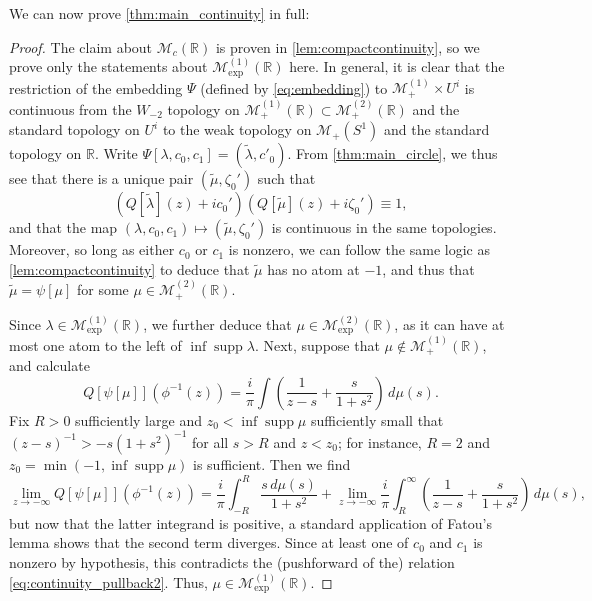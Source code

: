\documentclass{cams-l} %
\newcommand{\RR}{\mathbb R}
\newcommand{\cM}{\mathcal M}
\newcommand{\supp}{\operatorname{supp}}
\theoremstyle{definition}
\theoremstyle{remark}
\numberwithin{equation}{section}
\begin{document}
We can now prove \cref{thm:main_continuity} in full:
\thmmaincontinuity*
\begin{proof}
    The claim about $\cM_c(\RR)$ is proven in \cref{lem:compactcontinuity}, so we prove only the statements about $\cM_\text{exp}^{(1)}(\RR)$ here. In general, it is clear that the restriction of the embedding $\Psi$ (defined by \cref{eq:embedding}) to $\cM_+^{(1)}\times U^i$ is continuous from the $W_{-2}$ topology on $\cM_+^{(1)}(\RR)\subset\cM_+^{(2)}(\RR)$ and the standard topology on $U^i$ to the weak topology on $\cM_+(S^1)$ and the standard topology on $\RR$. Write $\Psi[\lambda,c_0,c_1] = (\widetilde{\lambda},c'_0)$. From \cref{thm:main_circle}, we thus see that there is a unique pair $(\widetilde{\mu},\zeta_0')$ such that
    \begin{equation}\label{eq:continuity_pullback2}
        (Q[\widetilde{\lambda}](z) + ic_0')(Q[\widetilde{\mu}](z) + i\zeta_0') \equiv 1,
    \end{equation}
    and that the map $(\lambda,c_0,c_1)\mapsto (\widetilde{\mu},\zeta_0')$ is continuous in the same topologies. Moreover, so long as either $c_0$ or $c_1$ is nonzero, we can follow the same logic as \cref{lem:compactcontinuity} to deduce that $\widetilde{\mu}$ has no atom at $-1$, and thus that $\widetilde{\mu}=\psi[\mu]$ for some $\mu\in\cM_+^{(2)}(\RR)$.
    
    Since $\lambda\in\cM_\mathrm{exp}^{(1)}(\RR)$, we further deduce that $\mu\in\cM_\mathrm{exp}^{(2)}(\RR)$, as it can have at most one atom to the left of $\inf\supp\lambda$. Next, suppose that $\mu\notin\cM_+^{(1)}(\RR)$, and calculate
    \[Q[\psi[\mu]](\phi^{-1}(z)) = \frac{i}{\pi}\int\left(\frac{1}{z-s} + \frac{s}{1+s^2}\right)\,d\mu(s).\]
    Fix $R>0$ sufficiently large and $z_0<\inf\supp\mu$ sufficiently small that $(z-s)^{-1}>-s(1+s^2)^{-1}$ for all $s>R$ and $z<z_0$; for instance, $R=2$ and $z_0 = \min(-1,\inf\supp\mu)$ is sufficient. Then we find
    \[\lim_{z\to-\infty}Q[\psi[\mu]](\phi^{-1}(z)) = \frac{i}{\pi}\int_{-R}^R\frac{s\,d\mu(s)}{1+s^2} + \lim_{z\to-\infty}\frac{i}{\pi}\int_{R}^{\infty}\left(\frac{1}{z-s} + \frac{s}{1+s^2}\right)\,d\mu(s),\]
    but now that the latter integrand is positive, a standard application of Fatou's lemma shows that the second term diverges. Since at least one of $c_0$ and $c_1$ is nonzero by hypothesis, this contradicts the (pushforward of the) relation \cref{eq:continuity_pullback2}. Thus, $\mu\in\cM_\mathrm{exp}^{(1)}(\RR)$.
    

\end{proof}
\end{document}
